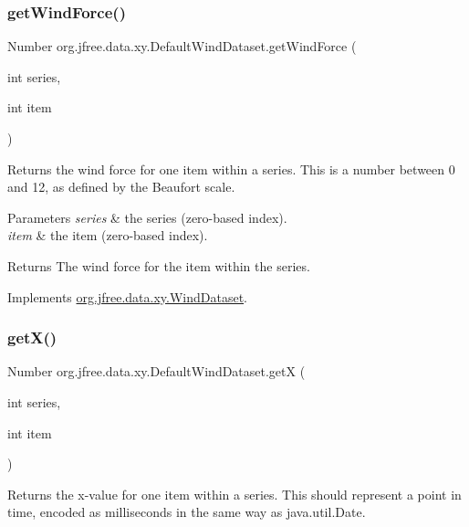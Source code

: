 \subsubsection{\texorpdfstring{get\+Wind\+Force()}{getWindForce()}}
{\footnotesize\ttfamily Number org.\+jfree.\+data.\+xy.\+Default\+Wind\+Dataset.\+get\+Wind\+Force (\begin{DoxyParamCaption}\item[{int}]{series,  }\item[{int}]{item }\end{DoxyParamCaption})}

Returns the wind force for one item within a series. This is a number between 0 and 12, as defined by the Beaufort scale.


\begin{DoxyParams}{Parameters}
{\em series} & the series (zero-\/based index). \\
\hline
{\em item} & the item (zero-\/based index).\\
\hline
\end{DoxyParams}
\begin{DoxyReturn}{Returns}
The wind force for the item within the series. 
\end{DoxyReturn}


Implements \mbox{\hyperlink{interfaceorg_1_1jfree_1_1data_1_1xy_1_1_wind_dataset_aae53f6715a54e1f6b34e2b7d19564463}{org.\+jfree.\+data.\+xy.\+Wind\+Dataset}}.

\mbox{\label{classorg_1_1jfree_1_1data_1_1xy_1_1_default_wind_dataset_af62edd939cd88c0bf2350231798c3892}} 
\subsubsection{\texorpdfstring{get\+X()}{getX()}}
{\footnotesize\ttfamily Number org.\+jfree.\+data.\+xy.\+Default\+Wind\+Dataset.\+getX (\begin{DoxyParamCaption}\item[{int}]{series,  }\item[{int}]{item }\end{DoxyParamCaption})}

Returns the x-\/value for one item within a series. This should represent a point in time, encoded as milliseconds in the same way as java.\+util.\+Date.


